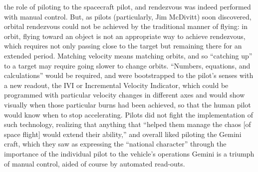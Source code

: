 the role of piloting to the spacecraft pilot, and rendezvous was
indeed performed with manual control. But, as
pilots (particularly, Jim McDivitt) soon discovered, orbital
rendezvous could not be achieved by the
traditional manner of flying: in orbit, flying toward an object is not
an appropriate way to achieve rendezvous, which requires not only
passing close to the target but remaining there for an extended
period. Matching velocity means matching orbits, and so ``catching
up'' to a target may require going slower to change orbits\cite[p.
  86]{DM}. ``Numbers, equations, and calculations'' would be 
required, and were bootstrapped to the pilot's senses with a new
readout, the IVI or Incremental Velocity Indicator, which could be
programmed with particular velocity changes in different axes and
would show visually when those particular burns had been achieved,
so that the human pilot would know when to stop accelerating\cite[p.
  86-87]{DM}. Pilots did not fight the implementation of such 
technology, realizing that anything that ``helped them manage the
chaos [of space flight] would extend their ability,'' and overall
liked piloting the Gemini craft, which they saw as expressing the
``national character'' through the importance of the individual pilot
to the vehicle's operations\cite[p. 88]{DM} Gemini is 
a triumph of manual control, aided of course by automated read-outs.

